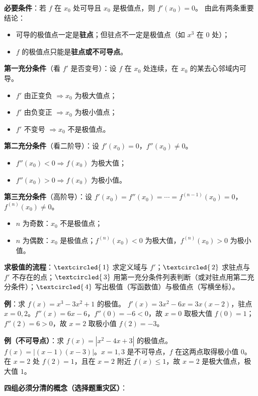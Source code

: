 \documentclass[11pt,openany,UTF8]{ctexbook}
\newcommand{\circled}[1]{\textcircled{\scriptsize\,#1}}
\begin{document}
\textbf{必要条件}：若 $f$ 在 $x_0$ 处可导且 $x_0$ 是极值点，则 $f'(x_0)=0$。 由此有两条重要结论：

\begin{itemize}
\item 可导的极值点一定是\textbf{驻点}；但驻点不一定是极值点（如 $x^3$ 在 $0$ 处）；
\item $f$ 的极值点只能是\textbf{驻点或不可导点}。
\end{itemize}
\textbf{第一充分条件}（看 $f'$ 是否变号）：设 $f$ 在 $x_0$ 处连续，在 $x_0$ 的某去心邻域内可导。

\begin{itemize}
\item $f'$ 由正变负 $\Rightarrow x_0$ 为极大值点；
\item $f'$ 由负变正 $\Rightarrow x_0$ 为极小值点；
\item $f'$ 不变号 $\Rightarrow x_0$ 不是极值点。
\end{itemize}
\textbf{第二充分条件}（看二阶导）：设 $f'(x_0)=0$，$f''(x_0)\ne0$。

\begin{itemize}
\item $f''(x_0)<0\Rightarrow f(x_0)$ 为极大值；
\item $f''(x_0)>0\Rightarrow f(x_0)$ 为极小值。
\end{itemize}
\textbf{第三充分条件}（高阶导）：设 $f'(x_0)=f''(x_0)=\cdots=f^{(n-1)}(x_0)=0$，$f^{(n)}(x_0)\ne0$。

\begin{itemize}
\item $n$ 为奇数：$x_0$ 不是极值点；
\item $n$ 为偶数：$x_0$ 是极值点；$f^{(n)}(x_0)<0$ 为极大值，$f^{(n)}(x_0)>0$ 为极小值。
\end{itemize}
\textbf{求极值的流程}：$\circled{1}$ 求定义域与 $f'$；$\circled{2}$ 求驻点与 $f'$ 不存在的点；$\circled{3}$ 用第一充分条件列表判断（或对驻点用第二充分条件）；$\circled{4}$ 写出极值（写函数值）与极值点（写横坐标）。

\textbf{例}：求 $f(x)=x^3-3x^2+1$ 的极值。 $f'(x)=3x^2-6x=3x(x-2)$，驻点 $x=0,2$。$f''(x)=6x-6$，$f''(0)=-6<0$，故 $x=0$ 取极大值 $f(0)=1$；$f''(2)=6>0$，故 $x=2$ 取极小值 $f(2)=-3$。

\textbf{例（不可导点）}：求 $f(x)=|x^2-4x+3|$ 的极值点。 $f(x)=|(x-1)(x-3)|$。$x=1,3$ 是不可导点，$f$ 在这两点取得极小值 $0$。在 $x=2$ 处 $f(2)=1$，且在 $x=2$ 附近 $f(x)\le1$，故 $x=2$ 是极大值点，极大值 $1$。

\textbf{四组必须分清的概念（选择题重灾区）}：
\end{document}
